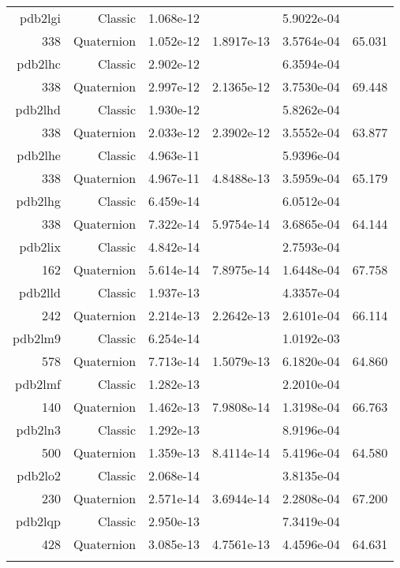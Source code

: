 \begin{xltabular}{\textwidth}{r|rS[table-format=1.3e+2]S[table-format=1.4e+2]S[table-format=1.4e+2]S[table-format=-1.3]}
pdb2lgi & Classic & 1.068e-12 &  & 5.9022e-04 & \\
338 & Quaternion & 1.052e-12 & 1.8917e-13 & 3.5764e-04 & 65.031\\  \addlinespace
pdb2lhc & Classic & 2.902e-12 &  & 6.3594e-04 & \\
338 & Quaternion & 2.997e-12 & 2.1365e-12 & 3.7530e-04 & 69.448\\  \addlinespace
pdb2lhd & Classic & 1.930e-12 &  & 5.8262e-04 & \\
338 & Quaternion & 2.033e-12 & 2.3902e-12 & 3.5552e-04 & 63.877\\  \addlinespace
pdb2lhe & Classic & 4.963e-11 &  & 5.9396e-04 & \\
338 & Quaternion & 4.967e-11 & 4.8488e-13 & 3.5959e-04 & 65.179\\  \addlinespace
pdb2lhg & Classic & 6.459e-14 &  & 6.0512e-04 & \\
338 & Quaternion & 7.322e-14 & 5.9754e-14 & 3.6865e-04 & 64.144\\  \addlinespace
pdb2lix & Classic & 4.842e-14 &  & 2.7593e-04 & \\
162 & Quaternion & 5.614e-14 & 7.8975e-14 & 1.6448e-04 & 67.758\\  \addlinespace
pdb2lld & Classic & 1.937e-13 &  & 4.3357e-04 & \\
242 & Quaternion & 2.214e-13 & 2.2642e-13 & 2.6101e-04 & 66.114\\  \addlinespace
pdb2lm9 & Classic & 6.254e-14 &  & 1.0192e-03 & \\
578 & Quaternion & 7.713e-14 & 1.5079e-13 & 6.1820e-04 & 64.860\\  \addlinespace
pdb2lmf & Classic & 1.282e-13 &  & 2.2010e-04 & \\
140 & Quaternion & 1.462e-13 & 7.9808e-14 & 1.3198e-04 & 66.763\\  \addlinespace
pdb2ln3 & Classic & 1.292e-13 &  & 8.9196e-04 & \\
500 & Quaternion & 1.359e-13 & 8.4114e-14 & 5.4196e-04 & 64.580\\  \addlinespace
pdb2lo2 & Classic & 2.068e-14 &  & 3.8135e-04 & \\
230 & Quaternion & 2.571e-14 & 3.6944e-14 & 2.2808e-04 & 67.200\\  \addlinespace
pdb2lqp & Classic & 2.950e-13 &  & 7.3419e-04 & \\
428 & Quaternion & 3.085e-13 & 4.7561e-13 & 4.4596e-04 & 64.631\\  \addlinespace

\end{xltabular}
